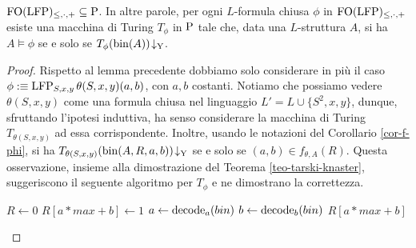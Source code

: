 \begin{proposizione}
\label{prop:FO(LFP)-subset-P}
 $\FOLFP \subseteq \P$. In altre parole, per ogni $L$-formula chiusa $\phi$ in $\FOLFP$ esiste
 una macchina di Turing $T_\phi$ in $\P$ tale che, data una $L$-struttura $A$,
 si ha $A \models \phi$ se e solo se $T_\phi(\bin(A))\accepts$.
\end{proposizione}
\begin{proof}
  Rispetto al lemma precedente dobbiamo solo considerare in più il caso
  $\phi :\equiv \LFP_{S,x,y}\theta(S,x,y)(a,b)$, con $a, b$ costanti.
  Notiamo che possiamo vedere
  $\theta(S,x,y)$ come una formula chiusa nel linguaggio $L'=L \cup \{S^2,x,y\}$,
  dunque, sfruttando l'ipotesi induttiva, ha senso considerare la macchina di
  Turing $T_{\theta(S,x,y)}$ ad essa
  corrispondente. Inoltre, usando le notazioni del Corollario \ref{cor-f-phi},
  si ha $T_{\theta(S,x,y)}(\bin(A,R,a,b))\accepts$
  se e solo se $(a,b) \in f_{\theta,A}(R)$. Questa osservazione, insieme alla
  dimostrazione del Teorema \ref{teo-tarski-knaster}, suggeriscono il seguente
  algoritmo per $T_\phi$ e ne dimostrano la correttezza.
  
  \begin{algorithmic}
    \State $R\gets 0$
	\State $R[a*max + b] \gets 1$
      \EndIf
      \EndFor
    \EndFor
    \State $a \gets \decode_a (bin)$
    \State $b \gets \decode_b (bin)$
    \State \Return $R[a*max + b]$
  \EndFunction
  \end{algorithmic}
\end{proof}

